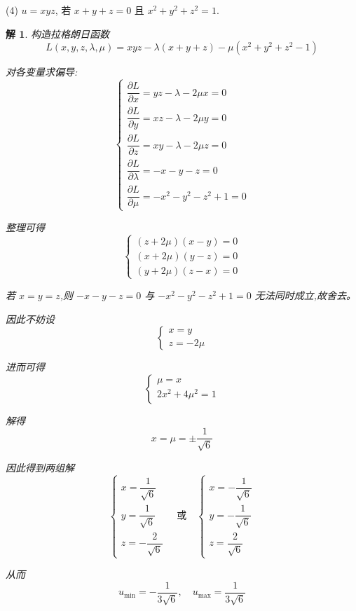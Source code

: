 \documentclass[a4paper,12pt]{article}
\newtheorem*{sol}{解}
\begin{document}
(4) $u = xyz$, 若 $x + y + z = 0$ 且 $x^2 + y^2 + z^2 = 1$.
\begin{sol}
    构造拉格朗日函数
    $$L(x,y,z,\lambda,\mu)=xyz-\lambda(x+y+z)-\mu(x^2+y^2+z^2-1)$$

    对各变量求偏导:
    $$\begin{cases}
            \dfrac{\partial L}{\partial x}=yz-\lambda-2\mu x=0 \\[8pt]
            \dfrac{\partial L}{\partial y}=xz-\lambda-2\mu y=0 \\[8pt]
            \dfrac{\partial L}{\partial z}=xy-\lambda-2\mu z=0 \\[8pt]
            \dfrac{\partial L}{\partial \lambda}=-x-y-z=0      \\[8pt]
            \dfrac{\partial L}{\partial \mu}=-x^2-y^2-z^2+1=0
        \end{cases}$$

    整理可得
    $$\begin{cases}
            (z+2\mu)(x-y)=0 \\[8pt]
            (x+2\mu)(y-z)=0 \\[8pt]
            (y+2\mu)(z-x)=0
        \end{cases}$$

    若 $x=y=z$,则 $-x-y-z=0$ 与 $-x^2-y^2-z^2+1=0$ 无法同时成立,故舍去。

    因此不妨设
    $$\begin{cases}
            x=y \\
            z=-2\mu
        \end{cases}$$

    进而可得
    $$\begin{cases}
            \mu=x \\
            2x^2+4\mu^2=1
        \end{cases}$$

    解得
    $$x=\mu=\pm\dfrac{1}{\sqrt{6}}$$

    因此得到两组解
    $$\begin{cases}
            x=\dfrac{1}{\sqrt{6}} \\[8pt]
            y=\dfrac{1}{\sqrt{6}} \\[8pt]
            z=-\dfrac{2}{\sqrt{6}}
        \end{cases}\quad\text{或}\quad\begin{cases}
            x=-\dfrac{1}{\sqrt{6}} \\[8pt]
            y=-\dfrac{1}{\sqrt{6}} \\[8pt]
            z=\dfrac{2}{\sqrt{6}}
        \end{cases}$$

    从而
    $$u_{\min}=-\dfrac{1}{3\sqrt{6}},\quad u_{\max}=\dfrac{1}{3\sqrt{6}}$$
\end{sol}
\end{document}
